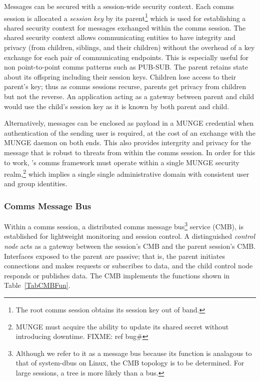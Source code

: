 Messages can be secured with a session-wide security context.
Each comms session is allocated a {\em session key} by its parent\footnote{
The root comms session obtains its session key out of band.}
which is used for establishing a shared security context
for messages exchanged within the comms session.
The shared security context allows communicating entities to have integrity
and privacy (from children, siblings, and their children)
without the overhead
of a key exchange for each pair of communicating endpoints.
This is especially useful for non point-to-point comms patterns such as PUB-SUB.
The parent retains state about its offspring including their session keys.
Children lose access to their parent's key;  thus as comms sessions recurse,
parents get privacy from children but not the reverse.
An application acting as a gateway between parent and child would use
the child's session key as it is known by both parent and child.

Alternatively, messages can be enclosed as payload in a MUNGE\cite{MUNGE}
credential when authentication of the sending user is required,
at the cost of an exchange with the MUNGE daemon on both ends.
This also provides intergrity and privacy for the message that
is robust to threats from within the comms session.
In order for this to work, \ngrm's comms framework must operate within a
single MUNGE security realm,\footnote{MUNGE must acquire the ability
to update its shared secret without introducing downtime. FIXME: ref bug\#}
which implies a single single administrative domain with consistent
user and group identities.

\subsubsection{Comms Message Bus}\label{SecCommsCMB}

Within a comms session, a distributed comms message bus\footnote{
Although we refer to it as a message bus because its function
is analagous to that of system-dbus on Linux, the CMB topology is to
be determined.  For large sessions, a tree is more likely than a bus.}
service (CMB), is established for lightweight monitoring and session control.
A distinguished {\em control node} acts as a gateway between the
session's CMB and the parent session's CMB.  Interfaces exposed to the
parent are passive; that is, the parent initiates connections and
makes requests or subscribes to data, and the child control node
responds or publishes data.  The CMB implements the functions shown
in Table~\ref{TabCMBFun}.

